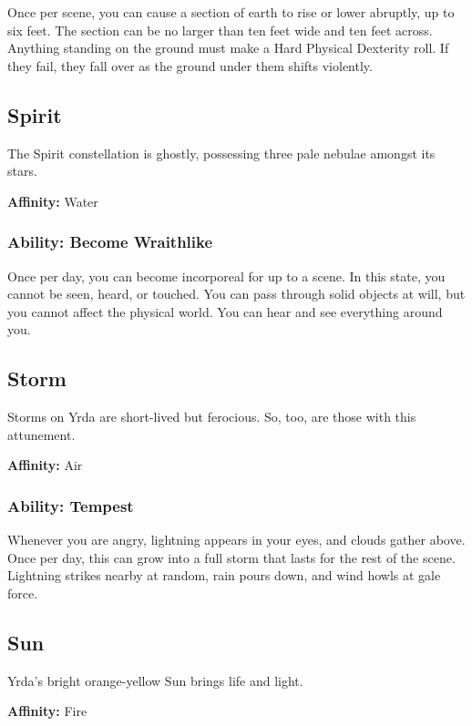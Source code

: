 \begin{multicols}{2}
Once per scene, you can cause a section of earth to rise or lower
abruptly, up to six feet. The section can be no larger than ten
feet wide and ten feet across. Anything standing on the ground
must make a Hard Physical Dexterity roll. If they fail, they fall
over as the ground under them shifts violently.

\subsection{Spirit}

The Spirit constellation is ghostly, possessing three pale nebulae amongst
its stars.

\textbf{Affinity:} Water

\subsubsection{Ability: Become Wraithlike}

Once per day, you can become incorporeal for up to a scene. In this state,
you cannot be seen, heard, or touched. You can pass through solid objects
at will, but you cannot affect the physical world. You can hear and see
everything around you.

\subsection{Storm}

Storms on Yrda are short-lived but ferocious. So, too, are those
with this attunement.

\textbf{Affinity:} Air

\subsubsection{Ability: Tempest}

Whenever you are angry, lightning appears in your eyes, and clouds
gather above. Once per day, this can grow into a full storm that lasts
for the rest of the scene. Lightning strikes nearby at random, rain pours
down, and wind howls at gale force.

\subsection{Sun}

Yrda's bright orange-yellow Sun brings life and light.

\textbf{Affinity:} Fire


\end{multicols}
